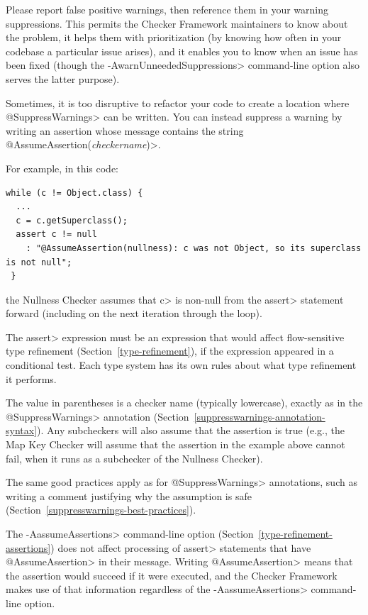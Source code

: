 \noindent
Please report false positive warnings, then reference them in your warning suppressions.
This permits the Checker Framework maintainers to know about the
problem, it helps them with prioritization (by knowing how often in your
codebase a particular issue arises), and it enables you to know when an
issue has been fixed (though the \<-AwarnUnneededSuppressions> command-line
option also serves the latter purpose).



\begin{sloppypar}
Sometimes, it is too disruptive to refactor your code to create a location
where \<@SuppressWarnings> can be written.  You can instead suppress a
warning by writing an assertion whose message contains the string
\<@AssumeAssertion(\emph{checkername})>.
\end{sloppypar}

For example, in this code:

\begin{Verbatim}
while (c != Object.class) {
  ...
  c = c.getSuperclass();
  assert c != null
    : "@AssumeAssertion(nullness): c was not Object, so its superclass is not null";
 }
\end{Verbatim}

\noindent
the Nullness Checker assumes that \<c> is non-null from the \<assert>
statement forward (including on the next iteration through the loop).

The \<assert> expression must be an expression that would affect flow-sensitive
type refinement (Section~\ref{type-refinement}), if the
expression appeared in a conditional test.  Each type system has its own
rules about what type refinement it performs.

The value in parentheses is a checker name (typically lowercase),
exactly as in the \<@SuppressWarnings> annotation
(Section~\ref{suppresswarnings-annotation-syntax}).
Any subcheckers will also assume that the
assertion is true (e.g., the Map Key Checker will assume that
the assertion in the example above cannot fail, when it runs
as a subchecker of the Nullness Checker).

The same good practices apply
as for \<@SuppressWarnings> annotations, such as writing a comment
justifying why the assumption is safe
(Section~\ref{suppresswarnings-best-practices}).

The \<-AassumeAssertions>
command-line option (Section~\ref{type-refinement-assertions}) does not
affect processing of \<assert> statements that have \<@AssumeAssertion> in
their message.  Writing \<@AssumeAssertion> means that the assertion would
succeed if it were executed, and the Checker Framework makes use of that
information regardless of the \<-AassumeAssertions>
command-line option.


